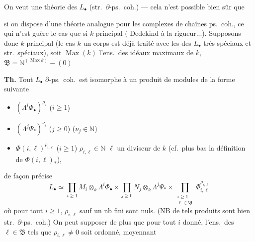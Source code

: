 \documentclass[11pt,a4paper]{article}
\begin{document}

On veut une théorie \ill{} des $L_{\bullet}$ (str.\ $\partial$-ps.\ coh.)
\struck{\ill{}} — cela n'est possible bien sûr que

\struck{\ill{}} si on dispose d'une théorie analogue pour les complexes de
chaînes \struck{\ill{}} ps.\ coh., ce qui n'est guère le cas que si
\struck{\ill{}} $k$ principal ( Dedekind à la rigueur...).
Supposons donc $k$ principal \struck{\ill{}} (le cas $k$ un corps est déjà
traité avec les \ill{} des $L_{\bullet}$ très spéciaux \struck{\ill{}} et
str.\ spéciaux), soit $\operatorname{Max}(k)$ l'ens.\ des idéaux
 maximaux de $k$, $\mathfrak{B} =
\mathbb{N}^{(\operatorname{Max} k)} - (0)$

\textbf{Th.} Tout $L_{\bullet}$  $\partial$-ps.\ coh.\ est
isomorphe à un produit de modules de la forme suivante
\begin{itemize}
  \item[a)] $(\Lambda^{i}\Phi_{\bullet})^{\mu_{i}}$ ($i \geqslant 1$)
   
  \item[b)] $(\Lambda^{j}\Psi_{*})^{\nu_{j}}$ ($j \geqslant 0$) ($\nu_{j} \in
  \mathbb{N}$)
  \item[c)] \struck{\ill{}} $\Phi(i, \ell)^{\rho_{i,\ell}}$ ($i \geqslant 1$)
  $\rho_{i,\ell} \in \mathbb{N}$  $\ell$ un
   diviseur de $k$ (cf.\ plus bas la définition de
  $\Phi(i,\ell)_{*}$),
\end{itemize}
de façon précise
\[
  L_{\bullet} \simeq \prod_{i \geqslant 1} M_{i} \otimes_{k}
  \Lambda^{i}\Phi_{\bullet} \times \prod_{j \geqslant 0} N_{j} \otimes_{k}
  \Lambda^{j}\Psi_{*} \times \prod_{\substack{i \geqslant 1\\ \ell \in
  \mathfrak{B}}} \Phi_{i,\ell}^{\rho_{i,\ell}}
\]
où pour tout \struck{\ill{}} $i \geqslant 1$, 
$\rho_{i,\ell}$ sauf un nb fini sont nuls. (NB de tels produits sont bien
str.\ $\partial$-ps.\ coh.) On peut supposer de plus que pour tout $i$
donné, l'ens.\ des $\ell \in \mathfrak{B}$ \struck{\ill{}} tels que
$\rho_{i,\ell} \neq 0$ soit  ordonné, moyennant
\end{document}
